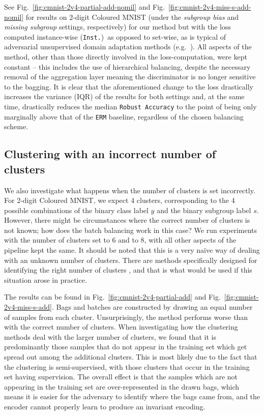 %
See Fig.~\ref{fig:cmnist-2v4-partial-add-nomil} and Fig.~\ref{fig:cmnist-2v4-miss-s-add-nomil} for
results on 2-digit Coloured MNIST (under the \emph{subgroup bias} and \emph{missing subgroup}
settings, respectively) for our method but with the loss computed instance-wise (\texttt{Inst.})\
as opposed to set-wise, as is typical of adversarial unsupervised domain adaptation methods (e.g.\
\citealp{ganin2016domain}).
%
All aspects of the method, other than those directly involved in the loss-computation, were kept
constant -- this includes the use of hierarchical balancing, despite the necessary removal of the
aggregation layer meaning the discriminator is no longer sensitive to the bagging.
%
It is clear that the aforementioned change to the loss drastically increases the variance (IQR) of
the results for both settings and, at the same time, drastically reduces the median \texttt{Robust
Accuracy} to the point of being only marginally above that of the \texttt{ERM} baseline, regardless
of the chosen balancing scheme.


\subsection{Clustering with an incorrect number of clusters}\label{sec:sm-overclustering}
We also investigate what happens when the number of clusters is set incorrectly. 
%
For 2-digit Coloured MNIST, we expect 4 clusters, corresponding to the 4 possible combinations of
the binary class label $y$ and the binary subgroup label $s$. 
%
However, there might be circumstances where the correct number of clusters is not known; how does
the batch balancing work in this case? 
%
We run experiments with the number of clusters set to 6 and to 8, with all other aspects of the
pipeline kept the same. 
%
It should be noted that this is a very na\"ive way of dealing with an unknown number of clusters. 
%
There are methods specifically designed for identifying the right number of clusters
\citep{hamerly2004learning,chazal2013persistence}, and that is what would be used if this situation
arose in practice.

The results can be found in Fig.~\ref{fig:cmnist-2v4-partial-add} and
Fig.~\ref{fig:cmnist-2v4-miss-s-add}. 
%
Bags and batches are constructed by drawing an equal number of samples from each cluster. 
%
Unsurprisingly, the method performs worse than with the correct number of clusters. 
%
When investigating how the clustering methods deal with the larger number of clusters, we found
that it is predominantly those samples that do not appear in the training set which get spread out
among the additional clusters. 
%
This is most likely due to the fact that the clustering is semi-supervised, with those clusters
that occur in the training set having supervision. 
%
The overall effect is that the samples which are not appearing in the training set are
over-represented in the drawn bags, which means it is easier for the adversary to identify where
the bags came from, and the encoder cannot properly learn to produce an invariant encoding.

